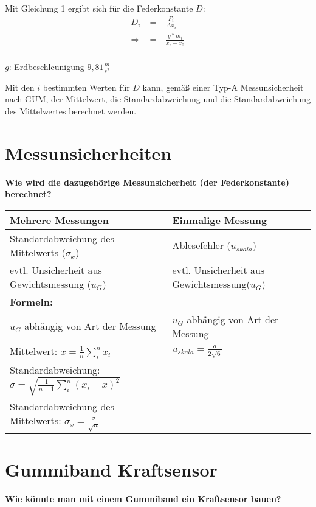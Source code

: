 \documentclass[a4paper, 12pt]{article}
\begin{document}

Mit Gleichung 1 ergibt sich für die Federkonstante $D$:
\begin{equation}
\begin{split}
D_i &= -\frac{F_i}{\Delta x_i}\\
\Rightarrow  &=-\frac{g*m_i}{x_i-x_0}\\
\end{split}
\end{equation}

\noindent $g$: Erdbeschleunigung $9,81\frac{m}{s^2}$

Mit den $i$ bestimmten Werten für $D$ kann, gemäß einer Typ-A Messunsicherheit nach GUM, der Mittelwert, die Standardabweichung und die Standardabweichung des Mittelwertes berechnet werden. 

\newpage
\section{Messunsicherheiten}
\textbf{Wie wird die dazugehörige Messunsicherheit (der Federkonstante) berechnet?}
\begin{table}[h]
\centering
\begin{tabular}{|l|l|}
\hline
\textbf{Mehrere Messungen} & \textbf{Einmalige Messung}\\
\hline
Standardabweichung des Mittelwerts ($\sigma_{\bar{x}}$) & Ablesefehler ($u_{skala}$)\\
evtl. Unsicherheit aus Gewichtsmessung ($u_G$)& evtl. Unsicherheit aus Gewichtsmessung($u_G$)\\
\hline
\multicolumn{1}{|l}{\textbf{Formeln:}}& \\
\hline
$u_G$ abhängig von Art der Messung & $u_G$ abhängig von Art der Messung\\
\hline
Mittelwert: $\bar{x} = \frac {1}{n}\sum_{i}^n x_i$ &  $u_{skala} = \frac {a}{2\sqrt{6}}$\\
\hline
Standardabweichung: $\sigma = \sqrt{\frac{1}{n-1}\sum_{i}^n (x_i - \bar{x})^2}$ &  \\
\hline
Standardabweichung des Mittelwerts: $\sigma_{\bar{x}}= \frac{\sigma}{\sqrt{n}}$ & \\
\hline
\end{tabular}
\end{table}

\section{Gummiband Kraftsensor}
\textbf{Wie könnte man mit einem Gummiband ein Kraftsensor bauen?}
\end{document}
